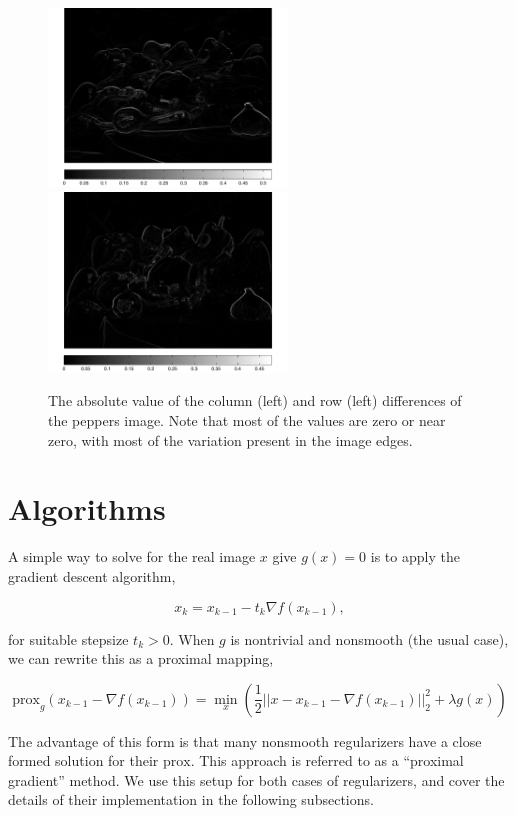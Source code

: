 \documentclass[10pt,a4paper]{article}
\newcommand{\prox}{\mathrm{prox}}
\begin{document}
\begin{figure}[H]
\centering
\includegraphics[width=2.5in]{../figures/diff1} \quad
\includegraphics[width=2.5in]{../figures/diff2}
\caption{The absolute value of the column (left) and row (left) differences of the peppers image. Note that most of the values are zero or near zero, with most of the variation present in the image edges. }
\end{figure}


\section{Algorithms}
A simple way to solve for the real image $x$ give $g(x) = 0$ is to apply the gradient descent algorithm,

\begin{equation}
x_k = x_{k-1} - t_k \nabla f(x_{k-1}),
\end{equation}

for suitable stepsize $t_k > 0$. When $g$ is nontrivial and nonsmooth (the usual case), we can rewrite this as a proximal mapping,

\begin{equation}
\prox_g(x_{k-1} - \nabla f(x_{k-1})) = \min_x \left( \frac{1}{2}||x-x_{k-1} - \nabla f(x_{k-1})||_2^2  + \lambda g(x)\right)
\end{equation}

The advantage of this form is that many nonsmooth regularizers have a close formed solution for their $\prox$. This approach is referred to as a ``proximal gradient'' method. We use this setup for both cases of regularizers, and cover the details of their implementation in the following subsections. 
\end{document}
